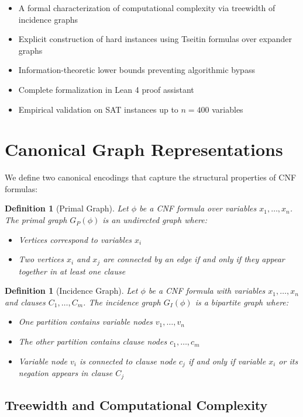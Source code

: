 \documentclass[11pt]{article}
\newtheorem{definition}[theorem]{Definition}
\begin{document}
\begin{itemize}
\item A formal characterization of computational complexity via treewidth of incidence graphs
\item Explicit construction of hard instances using Tseitin formulas over expander graphs
\item Information-theoretic lower bounds preventing algorithmic bypass
\item Complete formalization in Lean 4 proof assistant
\item Empirical validation on SAT instances up to $n=400$ variables
\end{itemize}

\section{Canonical Graph Representations}

We define two canonical encodings that capture the structural properties of CNF formulas:

\begin{definition}[Primal Graph]
Let $\phi$ be a CNF formula over variables $x_1, \ldots, x_n$. The \emph{primal graph} $G_P(\phi)$ is an undirected graph where:
\begin{itemize}
\item Vertices correspond to variables $x_i$
\item Two vertices $x_i$ and $x_j$ are connected by an edge if and only if they appear together in at least one clause
\end{itemize}
\end{definition}

\begin{definition}[Incidence Graph]
Let $\phi$ be a CNF formula with variables $x_1, \ldots, x_n$ and clauses $C_1, \ldots, C_m$. The \emph{incidence graph} $G_I(\phi)$ is a bipartite graph where:
\begin{itemize}
\item One partition contains variable nodes $v_1, \ldots, v_n$
\item The other partition contains clause nodes $c_1, \ldots, c_m$
\item Variable node $v_i$ is connected to clause node $c_j$ if and only if variable $x_i$ or its negation appears in clause $C_j$
\end{itemize}
\end{definition}

\subsection{Treewidth and Computational Complexity}
\end{document}
